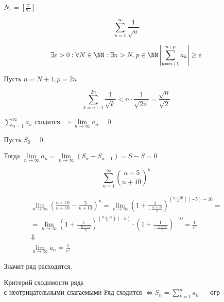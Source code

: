 \( N_{\varepsilon} = \left[ \frac{\pi}{2 \varepsilon} \right] \)

\begin{example}{}{}
    \[
        \sum\limits_{n = 1}^{\infty} \frac{1}{\sqrt{n}}
    \]
\end{example}

\[
    \exists \varepsilon > 0 : \forall N \in \NN : \exists n > N, p \in \NN 
    \left| \sum\limits_{k = n + 1}^{n + p} a_k \right| \geq \varepsilon
\]

Пусть \( n = N + 1, p = 2n \)

\[
    \sum\limits_{k = n + 1}^{2n} \frac{1}{\sqrt{k}} < n \cdot \frac{1}{\sqrt{2n}} = \frac{\sqrt{n}}{\sqrt{2}}
\]


\begin{prop}{}{}    
    \( \sum\limits_{n = 1}^{\infty} a_n \) сходится \( \Rightarrow \lim\limits_{n \to \infty} a_n = 0 \)
\end{prop}

Пусть \( S_0 = 0 \)

Тогда \( \lim\limits_{n \to \infty} a_n = \lim\limits_{n \to \infty} ( S_n - S_{n - 1} ) = S - S = 0 \)

\newpage

\begin{example}{}{}
    \[
        \sum\limits_{n = 1}^{\infty} \left( \frac{n + 5}{n + 10} \right)^n
    \]
\end{example}

\begin{gather*}
    \lim\limits_{n \to \infty} \left( \frac{n + 10}{n + 10} - \frac{5}{n + 10} \right)^n
    =
    \lim\limits_{n \to \infty} \left( 1 + \frac{1}{-\frac{n + 10}{5}} \right)^{ \left( \frac{n + 10}{5} \right) (-5) - 10}
    =
    \\
    =
    \lim\limits_{n \to \infty} \left( 1 + \frac{1}{-\frac{n + 10}{5}} \right)^{ \left( \frac{n + 10}{5} \right) (-5) }
    \cdot
    \left( 1 + \frac{1}{-\frac{n + 10}{5}} \right)^{-10}
    =
    \frac{1}{e^5}
    \\
    \Downarrow
    \\
    \lim\limits_{n \to \infty} a_n = \frac{1}{e^5}
\end{gather*}

Значит ряд расходится.

\begin{thrm}{Критерий сходимости ряда \\ с неотрицательными слагаемыми}{}
    Ряд сходится \( \Leftrightarrow S_n = \sum\limits_{k = 1}^n a_k \) --- огр
\end{thrm}

